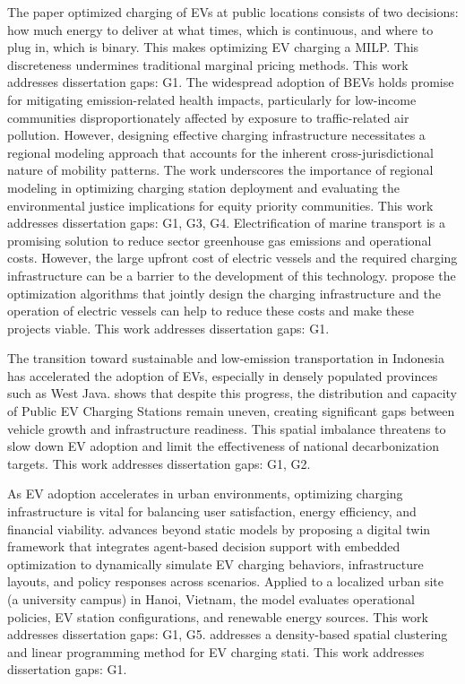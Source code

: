 \documentclass[letterpaper, 12pt, oneside, doublespacing]{Thesis}
\begin{document}
The paper \cite{pricing_electric_2026} optimized charging of EVs at public locations consists of two decisions: how much energy to deliver at what times, which is continuous, and where to plug in, which is binary. This makes optimizing EV charging a MILP. This discreteness undermines traditional marginal pricing methods. This work addresses dissertation gaps: G1. The widespread adoption of BEVs holds promise for mitigating emission-related health impacts, particularly for low-income communities disproportionately affected by exposure to traffic-related air pollution. However, designing effective charging infrastructure necessitates a regional modeling approach that accounts for the inherent cross-jurisdictional nature of mobility patterns. The work \cite{regional_transportation_2026} underscores the importance of regional modeling in optimizing charging station deployment and evaluating the environmental justice implications for equity priority communities. This work addresses dissertation gaps: G1, G3, G4. Electrification of marine transport is a promising solution to reduce sector greenhouse gas emissions and operational costs. However, the large upfront cost of electric vessels and the required charging infrastructure can be a barrier to the development of this technology. \cite{simultaneous_optimization_2026} propose the optimization algorithms that jointly design the charging infrastructure and the operation of electric vessels can help to reduce these costs and make these projects viable. This work addresses dissertation gaps: G1.

The transition toward sustainable and low-emission transportation in Indonesia has accelerated the adoption of EVs, especially in densely populated provinces such as West Java. \cite{strategic_planning_2026} shows that despite this progress, the distribution and capacity of Public EV Charging Stations remain uneven, creating significant gaps between vehicle growth and infrastructure readiness. This spatial imbalance threatens to slow down EV adoption and limit the effectiveness of national decarbonization targets. This work addresses dissertation gaps: G1, G2.



\noindent As EV adoption accelerates in urban environments, optimizing charging infrastructure is vital for balancing user satisfaction, energy efficiency, and financial viability. \cite{a_2025} advances beyond static models by proposing a digital twin framework that integrates agent-based decision support with embedded optimization to dynamically simulate EV charging behaviors, infrastructure layouts, and policy responses across scenarios. Applied to a localized urban site (a university campus) in Hanoi, Vietnam, the model evaluates operational policies, EV station configurations, and renewable energy sources. This work addresses dissertation gaps: G1, G5. \cite{hybrid_optimization_2025} addresses a density-based spatial clustering and linear programming method for EV charging stati. This work addresses dissertation gaps: G1.
\end{document}
